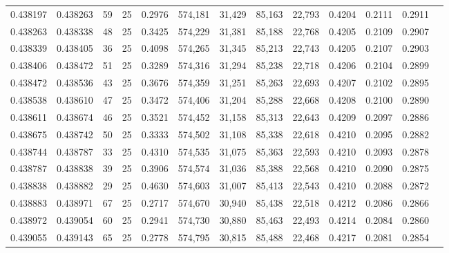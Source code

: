 \begin{tabular}{rrrrrrrrrrrrr}
0.438197 & 0.438263 &    59 &  25 &                                     0.2976 & 574,181 &  31,429 &  85,163 &  22,793 & 0.4204 & 0.2111 & 0.2911 \\
0.438263 & 0.438338 &    48 &  25 &                                     0.3425 & 574,229 &  31,381 &  85,188 &  22,768 & 0.4205 & 0.2109 & 0.2907 \\
0.438339 & 0.438405 &    36 &  25 &                                     0.4098 & 574,265 &  31,345 &  85,213 &  22,743 & 0.4205 & 0.2107 & 0.2903 \\
0.438406 & 0.438472 &    51 &  25 &                                     0.3289 & 574,316 &  31,294 &  85,238 &  22,718 & 0.4206 & 0.2104 & 0.2899 \\
0.438472 & 0.438536 &    43 &  25 &                                     0.3676 & 574,359 &  31,251 &  85,263 &  22,693 & 0.4207 & 0.2102 & 0.2895 \\
0.438538 & 0.438610 &    47 &  25 &                                     0.3472 & 574,406 &  31,204 &  85,288 &  22,668 & 0.4208 & 0.2100 & 0.2890 \\
0.438611 & 0.438674 &    46 &  25 &                                     0.3521 & 574,452 &  31,158 &  85,313 &  22,643 & 0.4209 & 0.2097 & 0.2886 \\
0.438675 & 0.438742 &    50 &  25 &                                     0.3333 & 574,502 &  31,108 &  85,338 &  22,618 & 0.4210 & 0.2095 & 0.2882 \\
0.438744 & 0.438787 &    33 &  25 &                                     0.4310 & 574,535 &  31,075 &  85,363 &  22,593 & 0.4210 & 0.2093 & 0.2878 \\
0.438787 & 0.438838 &    39 &  25 &                                     0.3906 & 574,574 &  31,036 &  85,388 &  22,568 & 0.4210 & 0.2090 & 0.2875 \\
0.438838 & 0.438882 &    29 &  25 &                                     0.4630 & 574,603 &  31,007 &  85,413 &  22,543 & 0.4210 & 0.2088 & 0.2872 \\
0.438883 & 0.438971 &    67 &  25 &                                     0.2717 & 574,670 &  30,940 &  85,438 &  22,518 & 0.4212 & 0.2086 & 0.2866 \\
0.438972 & 0.439054 &    60 &  25 &                                     0.2941 & 574,730 &  30,880 &  85,463 &  22,493 & 0.4214 & 0.2084 & 0.2860 \\
0.439055 & 0.439143 &    65 &  25 &                                     0.2778 & 574,795 &  30,815 &  85,488 &  22,468 & 0.4217 & 0.2081 & 0.2854 \\

\end{tabular}
